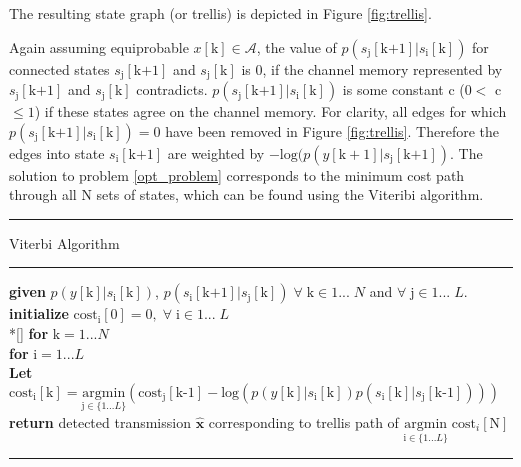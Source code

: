 The resulting state graph (or trellis) is depicted in Figure \ref{fig:trellis}. 

Again assuming equiprobable 
$x[\text{k}] \in \mathcal{A}$, the value of $p(s_{\text{j}}[\text{k+1}]|s_{\text{i}}[\text{k}])$ for connected states $s_{\text{j}}[\text{k+1}]$ and $s_{\text{j}}[\text{k}]$ is  0, if the channel memory represented by $s_{\text{j}}[\text{k+1}]$ and $s_{\text{j}}[\text{k}]$ contradicts. $p(s_{\text{j}}[\text{k+1}]|s_{\text{i}}[\text{k}])$  is some constant c ($0<$ c $\leq1$) if these states agree on the channel memory. For clarity, all edges for which $p(s_{\text{j}}[\text{k+1}]|s_{\text{i}}[\text{k}])=0$ have been removed in Figure \ref{fig:trellis}. Therefore the edges into state $s_{\text{i}}[\text{k+1}]$ are weighted by
$-\text{log}(p(y[\text{k}+1]|s_{\text{j}}[\text{k+1}])$. The solution to problem \ref{opt_problem} corresponds to the minimum cost path through all N sets of states, which can be found using the Viteribi algorithm. 
\\

    \noindent\rule[16pt]{\textwidth}{0.6pt}
	Viterbi Algorithm

    \noindent\rule[10pt]{\textwidth}{0.4pt}
    {\footnotesize
    \begin{tabbing}
        {\textbf{given}} $p(y[\text{k}]|s_{\text{i}}[\text{k}])$, $p(s_{\text{i}}[\text{k+1}]|s_{\text{j}}[\text{k}]) \; \forall  \; \text{k} \in {1...\;N}$ and $ \forall \; \text{j} \in {1...\;L}$.\\
        {\textbf{initialize}} $\text{cost}_{\text{i}}[0]=0, \; \forall \; \text{i} \in {1...\;L}$
         \\*[\smallskipamount]
        {\textbf{for}  $\text{k} = 1... N $} \\
         \qquad \= {\textbf{for} $\text{i} = 1... L$}\\
        \qquad \qquad \= \textbf{Let} $\text{cost}_{\text{i}}[\text{k}] = \underset{\text{j} \in \{1...L\}} {\text{argmin}}\left( \text{cost}_{\text{j}}[\text{k-1}]
        -\text{log}(p(y[\text{k}]|s_{\text{i}}[\text{k}])p(s_{\text{i}}[\text{k}]|s_{\text{j}}[\text{k-1}]))
        \right)$ \\
        {\textbf{ return}} detected transmission $\hat{\mathbf{x}}$ corresponding to trellis path of $\underset{\text{i} \in \{1...L\}} {\text{argmin}} \; \text{cost}_{i}[\text{N}] $
    \end{tabbing}}
    \noindent\rule[10pt]{\textwidth}{0.4pt}






